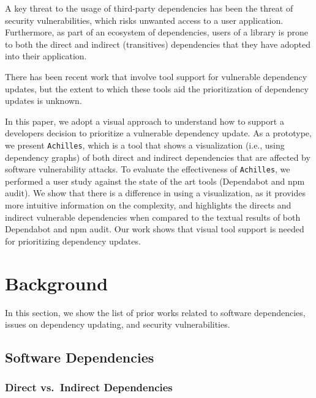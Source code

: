 \documentclass[conference]{IEEEtran}
\begin{document}
	A key threat to the usage of third-party dependencies has been the threat of security vulnerabilities, which risks unwanted access to a user application. 
	Furthermore, as part of an ecosystem of dependencies, users of a library is prone to both the direct and indirect (transitives) dependencies that they have adopted into their application. 
	
	There has been recent work that involve tool support for vulnerable dependency updates, but the extent to which these tools aid the prioritization of dependency updates is unknown. 
	
	In this paper, we adopt a visual approach to understand how to support a developers decision to prioritize a vulnerable dependency update.
	As a prototype, we present \texttt{Achilles}, which is a tool that shows a visualization (i.e., using dependency graphs) of both direct and indirect dependencies that are affected by software vulnerability attacks.
	To evaluate the effectiveness of \texttt{Achilles}, we performed a user study against the state of the art tools (Dependabot and npm audit). 
	We show that there is a difference in using a visualization, as it provides more intuitive information on the complexity, and highlights the directs and indirect vulnerable dependencies when compared to the textual results of both Dependabot and npm audit.
	Our work shows that  visual tool support is needed for prioritizing dependency updates. 
	
	\section{Background}
	In this section, we show the list of prior works related to software dependencies, issues on dependency updating, and security vulnerabilities.
	\subsection{Software Dependencies}
	\subsubsection{Direct vs.~Indirect Dependencies}
\end{document}
